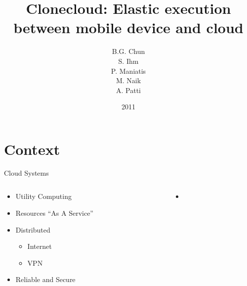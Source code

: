 \documentclass{beamer}
\title[CloneCloud]{Clonecloud: Elastic execution between mobile device and cloud \cite{clonecloud}}
\author{B.G. Chun\\S. Ihm\\P. Maniatis\\M. Naik\\A. Patti}
\institute{ACM, Intel, Berkeley, Princeton}
\date{2011}
\begin{document}
\begin{frame}
\titlepage
\end{frame}

\begin{frame}
		\tableofcontents
\end{frame}

\section{Context}

\begin{frame}{Cloud Systems}
\begin{columns}
\begin{column}{5cm}
\begin{itemize}
	\item Utility Computing
	\item Resources ``As A Service''
	\item Distributed
	\begin{itemize}
		\item Internet
		\item VPN
	\end{itemize}
	\item Reliable and Secure
\end{itemize}
\end{column}
\begin{column}{5cm}
\begin{itemize}
	\begin{itemize}
		\item {}
	\end{itemize}
\end{itemize}
\end{column}
\end{columns}
\end{frame}
\end{document}
